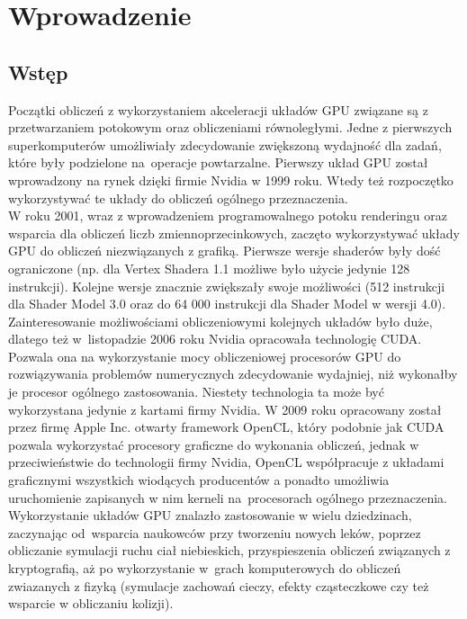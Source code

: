 \chapter{Wprowadzenie}
\label{t:int}

\section{Wstęp}
Początki obliczeń z wykorzystaniem akceleracji układów GPU związane są z przetwarzaniem potokowym oraz obliczeniami równoległymi. Jedne z pierwszych superkomputerów umożliwiały zdecydowanie zwiększoną wydajność dla zadań, które były podzielone na~operacje powtarzalne. Pierwszy układ GPU został wprowadzony na rynek dzięki firmie Nvidia w 1999 roku\cite{nvidia}. Wtedy też rozpoczętko wykorzystywać te układy do obliczeń ogólnego przeznaczenia. \\
W roku 2001, wraz z wprowadzeniem programowalnego potoku renderingu oraz wsparcia dla obliczeń liczb zmiennoprzecinkowych, zaczęto wykorzystywać układy GPU do obliczeń niezwiązanych z grafiką. Pierwsze wersje shaderów były dość ograniczone (np. dla Vertex Shadera 1.1 możliwe było użycie jedynie 128 instrukcji). Kolejne wersje znacznie zwiększały swoje możliwości (512 instrukcji dla Shader Model 3.0 oraz do 64 000 instrukcji dla Shader Model w wersji 4.0)\cite{wiki1}. \\
Zainteresowanie możliwościami obliczeniowymi kolejnych układów było duże, dlatego też w~listopadzie 2006 roku Nvidia opracowała technologię CUDA. Pozwala ona na wykorzystanie mocy obliczeniowej procesorów GPU do rozwiązywania problemów numerycznych zdecydowanie wydajniej, niż wykonałby je procesor ogólnego zastosowania. Niestety technologia ta może być wykorzystana jedynie z kartami firmy Nvidia. W 2009 roku opracowany został przez firmę Apple Inc. otwarty framework OpenCL, który podobnie jak CUDA pozwala wykorzystać procesory graficzne do wykonania obliczeń, jednak w przeciwieństwie do technologii firmy Nvidia, OpenCL współpracuje z układami graficznymi wszystkich wiodących producentów a ponadto umożliwia uruchomienie zapisanych w nim kerneli na~procesorach ogólnego przeznaczenia. \\
Wykorzystanie układów GPU znalazło zastosowanie w wielu dziedzinach, zaczynając od~wsparcia naukowców przy tworzeniu nowych leków, poprzez obliczanie symulacji ruchu ciał niebieskich, przyspieszenia obliczeń związanych z kryptografią, aż po wykorzystanie w~grach komputerowych do obliczeń zwiazanych z fizyką (symulacje zachowań cieczy, efekty cząsteczkowe czy też wsparcie w obliczaniu kolizji).

